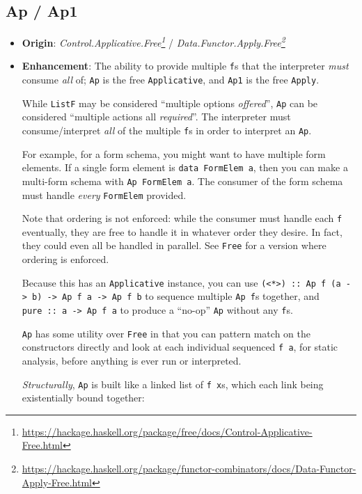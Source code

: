 \documentclass[]{article}
\renewcommand{\href}[2]{#2\footnote{\url{#1}}}
\begin{document}
\subsection{Ap / Ap1}\label{ap-ap1}

\begin{itemize}
\item
  \textbf{Origin}:
  \emph{\href{https://hackage.haskell.org/package/free/docs/Control-Applicative-Free.html}{Control.Applicative.Free}}
  /
  \emph{\href{https://hackage.haskell.org/package/functor-combinators/docs/Data-Functor-Apply-Free.html}{Data.Functor.Apply.Free}}
\item
  \textbf{Enhancement}: The ability to provide multiple \texttt{f}s that the
  interpreter \emph{must} consume \emph{all} of; \texttt{Ap} is the free
  \texttt{Applicative}, and \texttt{Ap1} is the free \texttt{Apply}.

  While \texttt{ListF} may be considered ``multiple options \emph{offered}'',
  \texttt{Ap} can be considered ``multiple actions all \emph{required}''. The
  interpreter must consume/interpret \emph{all} of the multiple \texttt{f}s in
  order to interpret an \texttt{Ap}.

  For example, for a form schema, you might want to have multiple form elements.
  If a single form element is \texttt{data\ FormElem\ a}, then you can make a
  multi-form schema with \texttt{Ap\ FormElem\ a}. The consumer of the form
  schema must handle \emph{every} \texttt{FormElem} provided.

  Note that ordering is not enforced: while the consumer must handle each
  \texttt{f} eventually, they are free to handle it in whatever order they
  desire. In fact, they could even all be handled in parallel. See \texttt{Free}
  for a version where ordering is enforced.

  Because this has an \texttt{Applicative} instance, you can use
  \texttt{(\textless{}*\textgreater{})\ ::\ Ap\ f\ (a\ -\textgreater{}\ b)\ -\textgreater{}\ Ap\ f\ a\ -\textgreater{}\ Ap\ f\ b}
  to sequence multiple \texttt{Ap\ f}s together, and
  \texttt{pure\ ::\ a\ -\textgreater{}\ Ap\ f\ a} to produce a ``no-op''
  \texttt{Ap} without any \texttt{f}s.

  \texttt{Ap} has some utility over \texttt{Free} in that you can pattern match
  on the constructors directly and look at each individual sequenced
  \texttt{f\ a}, for static analysis, before anything is ever run or
  interpreted.

  \emph{Structurally}, \texttt{Ap} is built like a linked list of
  \texttt{f\ x}s, which each link being existentially bound together:


\end{itemize}
\end{document}
